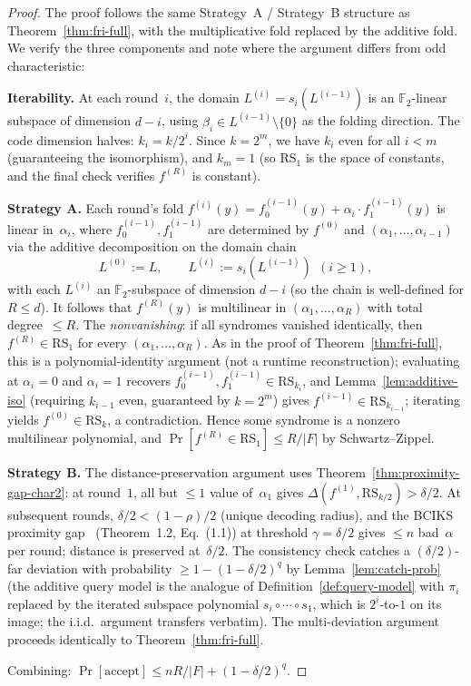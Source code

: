 \documentclass[11pt]{article}
\newcommand{\FF}{\mathbb{F}}
\newcommand{\RS}{\mathrm{RS}}
\begin{document}
\begin{proof}
The proof follows the same Strategy~A / Strategy~B structure as Theorem~\ref{thm:fri-full}, with the multiplicative fold replaced by the additive fold. We verify the three components and note where the argument differs from odd characteristic:

\textbf{Iterability.} At each round~$i$, the domain $L^{(i)} = s_i(L^{(i-1)})$ is an $\FF_2$-linear subspace of dimension $d{-}i$, using $\beta_i \in L^{(i-1)} \setminus \{0\}$ as the folding direction. The code dimension halves: $k_i = k/2^i$. Since $k = 2^m$, we have $k_i$ even for all $i < m$ (guaranteeing the isomorphism), and $k_m = 1$ (so $\RS_1$ is the space of constants, and the final check verifies $f^{(R)}$ is constant).

\textbf{Strategy A.} Each round's fold $f^{(i)}(y) = f^{(i-1)}_0(y) + \alpha_i \cdot f^{(i-1)}_1(y)$ is linear in~$\alpha_i$, where $f^{(i-1)}_0, f^{(i-1)}_1$ are determined by $f^{(0)}$ and $(\alpha_1, \ldots, \alpha_{i-1})$ via the additive decomposition on the domain chain
\[
L^{(0)} := L, \qquad L^{(i)} := s_i(L^{(i-1)}) \ \ (i \geq 1),
\]
with each $L^{(i)}$ an $\FF_2$-subspace of dimension $d{-}i$ (so the chain is well-defined for $R \leq d$). It follows that $f^{(R)}(y)$ is multilinear in $(\alpha_1, \ldots, \alpha_R)$ with total degree~$\leq R$. The \emph{nonvanishing}: if all syndromes vanished identically, then $f^{(R)} \in \RS_1$ for every $(\alpha_1, \ldots, \alpha_R)$. As in the proof of Theorem~\ref{thm:fri-full}, this is a polynomial-identity argument (not a runtime reconstruction); evaluating at $\alpha_i = 0$ and $\alpha_i = 1$ recovers $f^{(i-1)}_0, f^{(i-1)}_1 \in \RS_{k_i}$, and Lemma~\ref{lem:additive-iso} (requiring $k_{i-1}$ even, guaranteed by $k = 2^m$) gives $f^{(i-1)} \in \RS_{k_{i-1}}$; iterating yields $f^{(0)} \in \RS_k$, a contradiction. Hence some syndrome is a nonzero multilinear polynomial, and $\Pr[f^{(R)} \in \RS_1] \leq R/|F|$ by Schwartz--Zippel.

\textbf{Strategy B.} The distance-preservation argument uses Theorem~\ref{thm:proximity-gap-char2}: at round~$1$, all but $\leq 1$ value of~$\alpha_1$ gives $\Delta(f^{(1)}, \RS_{k/2}) > \delta/2$. At subsequent rounds, $\delta/2 < (1{-}\rho)/2$ (unique decoding radius), and the BCIKS proximity gap~\cite{BCIKS} (Theorem~1.2, Eq.~(1.1)) at threshold $\gamma = \delta/2$ gives $\leq n$ bad~$\alpha$ per round; distance is preserved at~$\delta/2$. The consistency check catches a $(\delta/2)$-far deviation with probability $\geq 1 - (1 - \delta/2)^q$ by Lemma~\ref{lem:catch-prob} (the additive query model is the analogue of Definition~\ref{def:query-model} with $\pi_i$ replaced by the iterated subspace polynomial $s_i \circ \cdots \circ s_1$, which is $2^i$-to-$1$ on its image; the i.i.d.\ argument transfers verbatim). The multi-deviation argument proceeds identically to Theorem~\ref{thm:fri-full}.

Combining: $\Pr[\text{accept}] \leq nR/|F| + (1 - \delta/2)^q$.
\end{proof}
\end{document}
